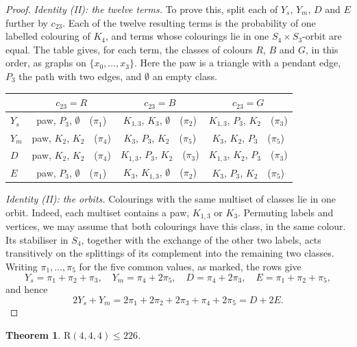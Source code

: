 \documentclass[11pt]{article}
\theoremstyle{spacedplain}
\newtheorem{theorem}{Theorem}[section]
\theoremstyle{spaceddef}
\theoremstyle{spacedremark}
\newcommand{\R}{\mathrm{R}}
\begin{document}
\begin{proof}
\emph{Identity (II): the twelve terms.}
To prove this, split each of $Y_s$, $Y_m$, $D$ and $E$ further by $c_{23}$.
Each of the twelve resulting terms is the probability of one labelled colouring of $K_4$, and terms whose colourings lie in one $S_4\times S_3$-orbit are equal.
The table gives, for each term, the classes of colours $R$, $B$ and $G$, in this order, as graphs on $\{x_0,\dots,x_3\}$.
Here the paw is a triangle with a pendant edge, $P_3$ the path with two edges, and $\emptyset$ an empty class.
\begin{center}\small
\begin{tabular}{lccc}
\toprule
 & $c_{23}=R$ & $c_{23}=B$ & $c_{23}=G$\\
\midrule
$Y_s$ & paw, $P_3$, $\emptyset$\ \ ($\pi_1$) & $K_{1,3}$, $K_3$, $\emptyset$\ \ ($\pi_2$) & $K_{1,3}$, $P_3$, $K_2$\ \ ($\pi_3$)\\
$Y_m$ & paw, $K_2$, $K_2$\ \ ($\pi_4$) & $K_3$, $P_3$, $K_2$\ \ ($\pi_5$) & $K_3$, $K_2$, $P_3$\ \ ($\pi_5$)\\
$D$ & paw, $K_2$, $K_2$\ \ ($\pi_4$) & $K_{1,3}$, $P_3$, $K_2$\ \ ($\pi_3$) & $K_{1,3}$, $K_2$, $P_3$\ \ ($\pi_3$)\\
$E$ & paw, $P_3$, $\emptyset$\ \ ($\pi_1$) & $K_3$, $K_{1,3}$, $\emptyset$\ \ ($\pi_2$) & $K_3$, $P_3$, $K_2$\ \ ($\pi_5$)\\
\bottomrule
\end{tabular}
\end{center}

\emph{Identity (II): the orbits.}
Colourings with the same multiset of classes lie in one orbit.
Indeed, each multiset contains a paw, $K_{1,3}$ or $K_3$.
Permuting labels and vertices, we may assume that both colourings have this class, in the same colour.
Its stabiliser in $S_4$, together with the exchange of the other two labels, acts transitively on the splittings of its complement into the remaining two classes.
Writing $\pi_1,\dots,\pi_5$ for the five common values, as marked, the rows give
\[
Y_s=\pi_1+\pi_2+\pi_3,\quad Y_m=\pi_4+2\pi_5,\quad D=\pi_4+2\pi_3,\quad E=\pi_1+\pi_2+\pi_5,
\]
and hence
\[
2Y_s+Y_m=2\pi_1+2\pi_2+2\pi_3+\pi_4+2\pi_5=D+2E.
\]
\end{proof}

\begin{theorem}\label{thm:444a}
$\R(4,4,4)\le 226$.
\end{theorem}
\end{document}
